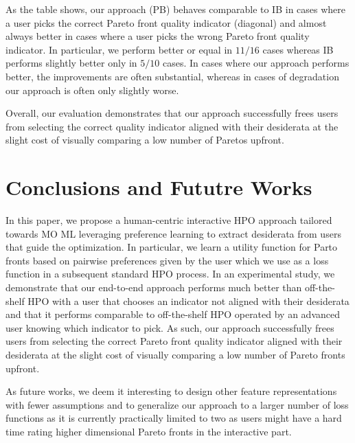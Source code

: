 As the table shows, our approach (PB) behaves comparable to IB in cases where a user picks the correct Pareto front quality indicator (diagonal) and almost always better in cases where a user picks the wrong Pareto front quality indicator. In particular, we perform better or equal in $11/16$ cases whereas IB performs slightly better only in $5/10$ cases. In cases where our approach performs better, the improvements are often substantial, whereas in cases of degradation our approach is often only slightly worse.

Overall, our evaluation demonstrates that our approach successfully frees users from selecting the correct quality indicator aligned with their desiderata at the slight cost of visually comparing a low number of Paretos upfront.

\section{Conclusions and Fututre Works}
\label{moo-sec:conclusion}
In this paper, we propose a human-centric interactive HPO approach tailored towards MO ML leveraging preference learning to extract desiderata from users that guide the optimization. In particular, we learn a utility function for Parto fronts based on pairwise preferences given by the user which we use as a loss function in a subsequent standard HPO process. In an experimental study, we demonstrate that our end-to-end approach performs much better than off-the-shelf HPO with a user that chooses an indicator not aligned with their desiderata and that it performs comparable to off-the-shelf HPO operated by an advanced user knowing which indicator to pick. As such, our approach successfully frees users from selecting the correct Pareto front quality indicator aligned with their desiderata at the slight cost of visually comparing a low number of Pareto fronts upfront.

As future works, we deem it interesting to design other feature representations with fewer assumptions and to generalize our approach to a larger number of loss functions as it is currently practically limited to two as users might have a hard time rating higher dimensional Pareto fronts in the interactive part.

